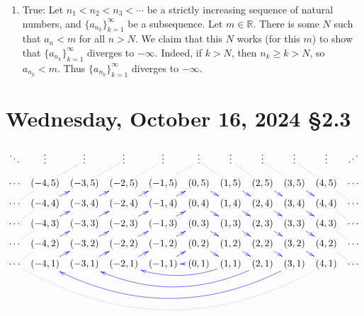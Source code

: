 \documentclass[12pt]{amsart}
\def\We{Wednesday}
\newcommand{\R}{{\mathbb{R}}}
\numberwithin{equation}{section}
\theoremstyle{plain} %
\newcommand{\Oct}[3]{\section{#2, October #1, 2024 \quad \S#3}}
\theoremstyle{definition}
\theoremstyle{remark}
\begin{document}
\begin{enumerate}
\begin{framed}
\begin{enumerate}
\item True: Let $n_1<n_2<n_3 < \cdots$ be a strictly increasing sequence of natural numbers, and $\{a_{n_k}\}_{k=1}^\infty$ be a subsequence. Let $m\in \R$. There is some $N$ such that $a_n < m$ for all $n>N$. We claim that this $N$ works (for this $m$) to show that $\{a_{n_k}\}_{k=1}^\infty$  diverges to $-\infty$. Indeed, if $k>N$, then $n_k \geq k >N$, so $a_{n_k} <m$. Thus $\{a_{n_k}\}_{k=1}^\infty$  diverges to $-\infty$.
\end{enumerate}\end{framed}
\end{enumerate}


\newpage 
\Oct{16}{\We}{2.3}

\begin{framed}
{\small
\begin{center}
\[{\xymatrix@C=.5em@R=.5em{ 
\ddots & \vdots & \vdots &  \vdots & \vdots & \vdots \ar@{.}@[blue][dr]& \vdots \ar@{.}@[blue][dr]& \vdots \ar@{.}@[blue][dr]& \vdots \ar@{.}@[blue][dr]&  \vdots & \reflectbox{$\ddots$} \\
\cdots & (-4,5) \ar@{.}@[blue][ur]& (-3,5) \ar@{.}@[blue][ur]& (-2,5) \ar@{.}@[blue][ur]& (-1,5) \ar@{.}@[blue][ur]& (0,5) \ar@{->}@[blue][dr]
& (1,5) \ar@{->}@[blue][dr]& (2,5) \ar@{->}@[blue][dr]& (3,5) \ar@{->}@[blue][dr]& (4,5)\ar@{.}@[blue][dr] & \cdots \\
\cdots \ar@{.}@[blue][ur]& (-4,4) \ar@{->}@[blue][ur]& (-3,4) \ar@{->}@[blue][ur]& (-2,4) \ar@{->}@[blue][ur]& (-1,4) \ar@{->}@[blue][ur]& (0,4) \ar@{->}@[blue][dr]
& (1,4) \ar@{->}@[blue][dr]& (2,4) \ar@{->}@[blue][dr]& (3,4) \ar@{->}@[blue][dr]& (4,4) \ar@{.}@[blue][dr]& \cdots \\
\cdots \ar@{.}@[blue][ur]& (-4,3) \ar@{->}@[blue][ur]& (-3,3) \ar@{->}@[blue][ur]& (-2,3) \ar@{->}@[blue][ur]& (-1,3) \ar@{->}@[blue][ur]& (0,3) \ar@{->}@[blue][dr]
& (1,3) \ar@{->}@[blue][dr]& (2,3) \ar@{->}@[blue][dr]& (3,3) \ar@{->}@[blue][dr]& (4,3) \ar@{.}@[blue][dr]& \cdots \\
\cdots \ar@{.}@[blue][ur]& (-4,2) \ar@{->}@[blue][ur]& (-3,2) \ar@{->}@[blue][ur]& (-2,2) \ar@{->}@[blue][ur]& (-1,2) \ar@{->}@[blue][ur] & (0,2) \ar@{->}@[blue][dr]
& (1,2) \ar@{->}@[blue][dr] & (2,2) \ar@{->}@[blue][dr]& (3,2) \ar@{->}@[blue][dr]& (4,2) \ar@{.}@[blue][dr]& \cdots \\
\cdots \ar@{.}@[blue][ur] & (-4,1) \ar@{->}@[blue][ur]& (-3,1) \ar@{->}@[blue][ur] & (-2,1) \ar@{->}@[blue][ur]& (-1,1) \ar@{->}@[blue][ur]& (0,1) \ar@{->}@[blue][l]
& (1,1) \ar@/^1pc/@[blue][lll]& (2,1) \ar@/^2pc/@[blue][lllll] & (3,1) \ar@/^3pc/@[blue][lllllll] & (4,1)  \ar@{.}@/^4pc/@[blue][lllllllll]& \cdots \\
 }}\]
 \end{center}
 }



\end{framed}
\end{document}
